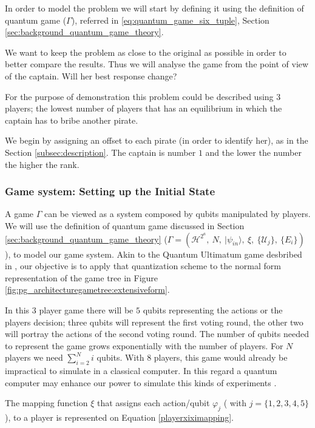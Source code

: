 In order to model the problem we will start by defining it using the definition of quantum game ($\Gamma$), referred in \ref{eq:quantum_game_six_tuple}, Section \ref{sec:background_quantum_game_theory}\cite{Fra2011a}.

We want to keep the problem as close to the original as possible in order to better compare the results. Thus we will analyse the game from the point of view of the captain. Will her best response change?

For the purpose of demonstration this problem could be described using $3$ players; the lowest number of players that has an equilibrium in which the captain has to bribe another pirate. 

We begin by assigning an offset to each pirate (in order to identify her), as in the Section \ref{subsec:description}. The captain is number $1$ and the lower the number the higher the rank. 



\subsubsection{Game system: Setting up the Initial State}
\label{subsec:pirates_initialstate}

A game $\Gamma$ can be viewed as a system composed by qubits manipulated by players. We will use the definition of quantum game discussed in Section \ref{sec:background_quantum_game_theory} ($\Gamma=(\mathcal{H}^{2^{a}},\: N,\:\vert\psi_{in}\rangle,\:\xi,\:\{\mathcal{U}_{j}\},\:\{E_{i}\})
$), to model our game system. Akin to the Quantum Ultimatum game desbribed in \cite{Fra2011}, our objective is to apply that quantization scheme to the normal form representation of the game tree in Figure \ref{fig:pg_architecturegametree:extensiveform}.


In this $3$ player game there will be $5$ qubits representing the actions or the players decision; three qubits will represent the first voting round, the other two will portray the actions of the second voting round.
The number of qubits needed to represent the game grows exponentially with the number of players. For $N$ players we need $\sum_{i=2}^{N}{i}$ qubits. With 8 players, this game would already be impractical to simulate in a classical computer. In this regard a quantum computer may enhance our power to simulate this kinds of experiments \cite{Rieffel2011}.

The mapping function $\xi$ that assigns each action/qubit $\varphi_{j}$ ( with $j=\{ 1, 2, 3, 4, 5\}$), to a player is represented on Equation \ref{playerxiximapping}. 

